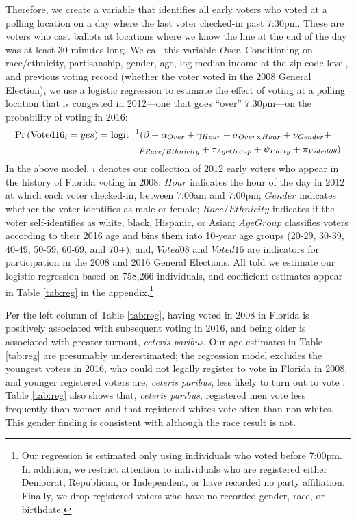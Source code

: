 \documentclass[12pt,titlepage]{article}
\begin{document}
Therefore, we create a variable that identifies all early voters who
voted at a polling location on a day where the last voter checked-in
past 7:30pm.  These are voters who cast ballots at locations where we
know the line at the end of the day was at least 30 minutes long.  We
call this variable \emph{Over}.  Conditioning on race/ethnicity,
partisanship, gender, age, log median income at the zip-code level,
and previous voting record (whether the voter voted in the 2008
General Election), we use a logistic regression to estimate the effect
of voting at a polling location that is congested in 2012---one that
goes ``over'' 7:30pm---on the probability of voting in 2016:
\begin{equation*}
  \begin{aligned}
    \textup{Pr}\left(\mathrm{Voted16}_{i} = yes\right) =  \textup{logit}^{-1}&(\beta + \alpha_{Over} + \gamma_{Hour} +
    \sigma_{Over \times Hour} + \upsilon_{Gender}  + \\& \rho_{Race/Ethnicity} +
      \tau_{Age Group} + \psi_{Party} + \pi_{Voted\emph{08}})
  \end{aligned}  %
\end{equation*}
%
In the above model, $i$ denotes our collection of 2012 early voters
who appear in the history of Florida voting in 2008; $Hour$ indicates
the hour of the day in 2012 at which each voter checked-in, between
7:00am and 7:00pm; $Gender$ indicates whether the voter identifies as
male or female; $Race/Ethnicity$ indicates if the voter
self-identifies as white, black, Hispanic, or Asian; $AgeGroup$
classifies voters according to their 2016 age and bins them into
10-year age groups (20-29, 30-39, 40-49, 50-59, 60-69, and 70+); and,
$Voted08$ and $Voted16$ are indicators for participation in the 2008
and 2016 General Elections.  All told we estimate our logistic
regression based on 758,266 individuals, and coefficient estimates
appear in Table \ref{tab:reg} in the appendix.\footnote{Our regression
  is estimated only using individuals who voted before 7:00pm.  In
  addition, we restrict attention to individuals who are registered
  either Democrat, Republican, or Independent, or have recorded no
  party affiliation.  Finally, we drop registered voters who have no
  recorded gender, race, or birthdate.}  %

Per the left column of Table \ref{tab:reg}, having voted in 2008 in
Florida is positively associated with subsequent voting in 2016, and
being older is associated with greater turnout, \emph{ceteris
  paribus}.  Our age estimates in Table \ref{tab:reg} are presumably
underestimated; the regression model excludes the youngest voters in
2016, who could not legally register to vote in Florida in 2008, and
younger registered voters are, \emph{ceteris paribus}, less likely to
turn out to vote \citep{shinosmith:registrationtiming}.  Table
\ref{tab:reg} also shows that, \emph{ceteris paribus}, registered men
vote less frequently than women and that registered whites vote often
than non-whites.  This gender finding is consistent with
\citet{leighleynagler:whovotesnow} although the race result is not.
\end{document}
